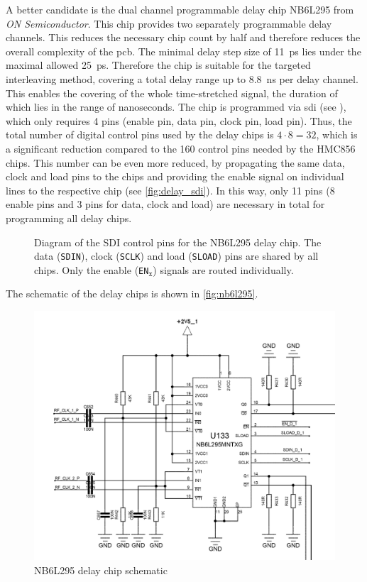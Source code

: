 A better candidate is the dual channel programmable delay chip NB6L295 from \textit{ON Semiconductor}. 
This chip provides two separately programmable delay channels. 
This reduces the necessary chip count by half and therefore reduces the overall complexity of the \gls{pcb}.
The minimal delay step size of \SI{11}{\pico\second} lies under the maximal allowed \SI{25}{\pico \second}. Therefore the chip is suitable for the targeted interleaving method, covering a total delay range up to \SI{8.8}{\nano\second} per delay channel.
This enables the covering of the whole time-stretched signal, the duration of which lies in the range of nanoseconds.
The chip is programmed via \gls{sdi} (see \cite{NB6L295}), which only requires 4 pins (enable pin, data pin, clock pin, load pin). 
Thus, the total number of digital control pins used by the delay chips is $4\cdot8 = 32$, which is a significant reduction compared to the 160 control pins needed by the HMC856 chips. 
This number can be even more reduced, by propagating the same data, clock and load pins to the chips and providing the enable signal on individual lines to the respective chip (see \autoref{fig:delay_sdi}). 
In this way, only 11 pins (8 enable pins and 3 pins for data, clock and load) are necessary in total for programming all delay chips. 

\begin{figure}[tb]
	\centering
	\resizebox{1\textwidth}{!}{}
	\caption[Delay chip SDI connections]{Diagram of the SDI control pins for the NB6L295 delay chip. The data (\texttt{SDIN}), clock (\texttt{SCLK}) and load (\texttt{SLOAD}) pins are shared by all chips. Only the enable (\texttt{EN}$_\texttt{x}$) signals are routed individually.}
	\label{fig:delay_sdi}
\end{figure}

The schematic of the delay chips is shown in \autoref{fig:nb6l295}.

\begin{figure}[tb]
	\centering
	\includegraphics[width = \textwidth]{chap/04-theresa/img/schematic/delay_chip}
	\caption{NB6L295 delay chip schematic}
	\label{fig:nb6l295}
\end{figure}



